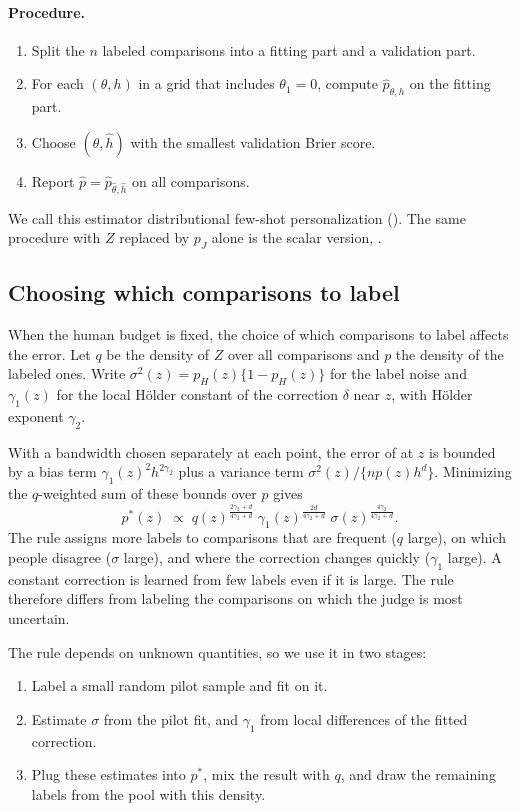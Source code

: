 \paragraph{Procedure.}
\begin{enumerate}
  \item Split the $n$ labeled comparisons into a fitting part and a validation part.
  \item For each $(\theta,h)$ in a grid that includes $\theta_1=0$, compute $\hat p_{\theta,h}$ on
        the fitting part.
  \item Choose $(\hat\theta,\hat h)$ with the smallest validation Brier score.
  \item Report $\hat p=\hat p_{\hat\theta,\hat h}$ on all comparisons.
\end{enumerate}
We call this estimator distributional few-shot personalization (\dfsp). The same procedure with $Z$
replaced by $p_J$ alone is the scalar version, \sfsp.

\subsection{Choosing which comparisons to label}
\label{sec:selection}

When the human budget is fixed, the choice of which comparisons to label affects the error. Let
$q$ be the density of $Z$ over all comparisons and $p$ the density of the labeled ones. Write
$\sigma^2(z)=p_H(z)\{1-p_H(z)\}$ for the label noise and $\gamma_1(z)$ for the local H\"older
constant of the correction $\delta$ near $z$, with H\"older exponent $\gamma_2$.

With a bandwidth chosen separately at each point, the error of \dfsp{} at $z$ is bounded by a bias
term $\gamma_1(z)^2h^{2\gamma_2}$ plus a variance term $\sigma^2(z)/\{np(z)h^d\}$. Minimizing the
$q$-weighted sum of these bounds over $p$ gives
\[
  p^{*}(z)\;\propto\;q(z)^{\frac{2\gamma_2+d}{4\gamma_2+d}}\;
  \gamma_1(z)^{\frac{2d}{4\gamma_2+d}}\;\sigma(z)^{\frac{4\gamma_2}{4\gamma_2+d}} .
\]
The rule assigns more labels to comparisons that are frequent ($q$ large), on which people
disagree ($\sigma$ large), and where the correction changes quickly ($\gamma_1$ large). A constant
correction is learned from few labels even if it is large. The rule therefore differs from
labeling the comparisons on which the judge is most uncertain.

The rule depends on unknown quantities, so we use it in two stages:
\begin{enumerate}
  \item Label a small random pilot sample and fit \dfsp{} on it.
  \item Estimate $\sigma$ from the pilot fit, and $\gamma_1$ from local differences of the fitted
        correction.
  \item Plug these estimates into $p^{*}$, mix the result with $q$, and draw the remaining labels
        from the pool with this density.
\end{enumerate}

